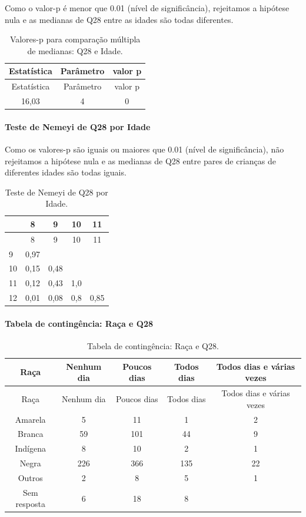 \documentclass[]{article}
\let\oldparagraph\paragraph
\renewcommand{\paragraph}[1]{\oldparagraph{#1}\mbox{}}
\begin{document}
Como o valor-p é menor que 0.01 (nível de significância), rejeitamos a hipótese nula e as medianas de Q28 entre as idades são todas diferentes.

\begin{longtable}[]{@{}ccc@{}}
\caption{\label{tab:unnamed-chunk-866}Valores-p para comparação múltipla de medianas: Q28 e Idade.}\tabularnewline
\toprule
Estatística & Parâmetro & valor p\tabularnewline
\midrule
\endfirsthead
\toprule
Estatística & Parâmetro & valor p\tabularnewline
\midrule
\endhead
16,03 & 4 & 0\tabularnewline
\bottomrule
\end{longtable}

\hypertarget{teste-de-nemeyi-de-q28-por-idade}{%
\paragraph{Teste de Nemeyi de Q28 por Idade}\label{teste-de-nemeyi-de-q28-por-idade}}

Como os valores-p são iguais ou maiores que 0.01 (nível de significância), não rejeitamos a hipótese nula e as medianas de Q28 entre pares de crianças de diferentes idades são todas iguais.

\begin{longtable}[]{@{}lcccc@{}}
\caption{\label{tab:unnamed-chunk-868}Teste de Nemeyi de Q28 por Idade.}\tabularnewline
\toprule
& 8 & 9 & 10 & 11\tabularnewline
\midrule
\endfirsthead
\toprule
& 8 & 9 & 10 & 11\tabularnewline
\midrule
\endhead
9 & 0,97 & & &\tabularnewline
10 & 0,15 & 0,48 & &\tabularnewline
11 & 0,12 & 0,43 & 1,0 &\tabularnewline
12 & 0,01 & 0,08 & 0,8 & 0,85\tabularnewline
\bottomrule
\end{longtable}

\cleardoublepage

\hypertarget{tabela-de-continguxeancia-rauxe7a-e-q28}{%
\paragraph{Tabela de contingência: Raça e Q28}\label{tabela-de-continguxeancia-rauxe7a-e-q28}}

\begin{longtable}[]{@{}ccccc@{}}
\caption{\label{tab:unnamed-chunk-869}Tabela de contingência: Raça e Q28.}\tabularnewline
\toprule
Raça & Nenhum dia & Poucos dias & Todos dias & Todos dias e várias vezes\tabularnewline
\midrule
\endfirsthead
\toprule
Raça & Nenhum dia & Poucos dias & Todos dias & Todos dias e várias vezes\tabularnewline
\midrule
\endhead
Amarela & 5 & 11 & 1 & 2\tabularnewline
Branca & 59 & 101 & 44 & 9\tabularnewline
Indígena & 8 & 10 & 2 & 1\tabularnewline
Negra & 226 & 366 & 135 & 22\tabularnewline
Outros & 2 & 8 & 5 & 1\tabularnewline
Sem resposta & 6 & 18 & 8 &\tabularnewline
\bottomrule
\end{longtable}
\end{document}
